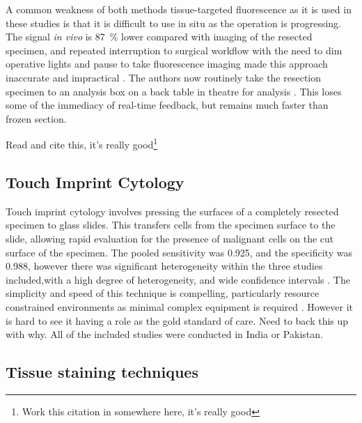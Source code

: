 A common weakness of both methods tissue-targeted fluorescence as it is used in these studies is that it is difficult to use in situ as the operation is progressing. 
The signal \textit{in vivo} is \SI{87}{\percent} lower compared with imaging of the resected specimen, and repeated interruption to surgical workflow with the need to dim operative lights and pause to take fluorescence imaging made this approach inaccurate and impractical \cite{mooreCharacterizingUtilityLimitations2017}.
The authors now routinely take the resection specimen to an analysis box on a back table in theatre for analysis \cite{gaor.w.DeterminationTumorMargins2018}. 
This loses some of the immediacy of real-time feedback, but remains much faster than frozen section.

Read and cite this, it's really good\cite{leey.-j.IntraoperativeFluorescenceGuidedSurgery2020}\footnote{Work this citation in somewhere here, it's really good}

\subsection{Touch Imprint Cytology}

Touch imprint cytology involves pressing the surfaces of a completely resected specimen to glass slides.
This transfers cells from the specimen surface to the slide, allowing rapid evaluation for the presence of malignant cells on the cut surface of the specimen.
The pooled sensitivity was 0.925, and the specificity was 0.988, however there was significant heterogeneity within the three studies included,with a high degree of heterogeneity, and wide confidence intervals \cite{zafara.DiagnosticUtilityTouch2020, yadavg.s.IntraoperativeImprintEvaluation2013, naveedDiagnosticAccuracyTouch2017}.
The simplicity and speed of this technique is compelling, particularly resource constrained environments as minimal complex equipment is required \cite{naveedDiagnosticAccuracyTouch2017}.
However it is hard to see it having a role as the gold standard of care. Need to back this up with why.
All of the included studies were conducted in India or Pakistan.



\subsection{Tissue staining techniques}

